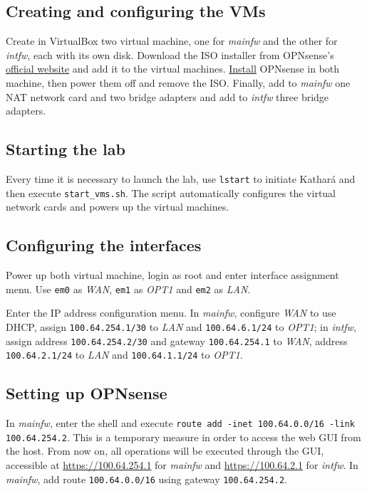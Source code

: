 \documentclass{homework}
\newcommand{\kat}{Kathará\xspace}
\newcommand{\opn}{OPNsense\xspace}
\newcommand{\vb}{VirtualBox\xspace}
\newcommand{\intfw}{\textit{intfw}\xspace}
\newcommand{\mainfw}{\textit{mainfw}\xspace}
\newcommand{\lan}{\textit{LAN}\xspace}
\newcommand{\opt}{\textit{OPT1}\xspace}
\newcommand{\wan}{\textit{WAN}\xspace}
\begin{document}
    \subsection{Creating and configuring the VMs}
    Create in \vb two virtual machine, one for \mainfw and the other for \intfw, each with its own disk. Download the ISO installer from \opn's \href{https://opnsense.org/download/}{official website} and add it to the virtual machines. \href{https://docs.opnsense.org/manual/install.html}{Install} \opn in both machine, then power them off and remove the ISO.
    Finally, add to \mainfw one NAT network card and two bridge adapters and add to \intfw three bridge adapters.
    
    \subsection{Starting the lab}
    Every time it is necessary to launch the lab, use \texttt{lstart} to initiate \kat and then execute \texttt{start\_vms.sh}.
    The script automatically configures the virtual network cards and powers up the virtual machines. 
    
    \subsection{Configuring the interfaces}
    Power up both virtual machine, login as root and enter interface assignment menu. Use \texttt{em0} as \wan, \texttt{em1} as \opt and \texttt{em2} as \lan.
    
    Enter the IP address configuration menu. In \mainfw, configure \wan to use DHCP, assign \texttt{100.64.254.1/30} to \lan and \texttt{100.64.6.1/24} to \opt; in \intfw, assign address \texttt{100.64.254.2/30} and gateway \texttt{100.64.254.1} to \wan, address \texttt{100.64.2.1/24} to \lan and \texttt{100.64.1.1/24} to \opt.
    
    \subsection{Setting up \opn}
    In \mainfw, enter the shell and execute \texttt{route add -inet 100.64.0.0/16 -link \\ 100.64.254.2}. This is a temporary measure in order to access the web GUI from the host. From now on, all operations will be executed through the GUI, accessible at \url{https://100.64.254.1} for \mainfw and \url{https://100.64.2.1} for \intfw. In \mainfw, add route \texttt{100.64.0.0/16} using gateway \texttt{100.64.254.2}.
    
\end{document}
